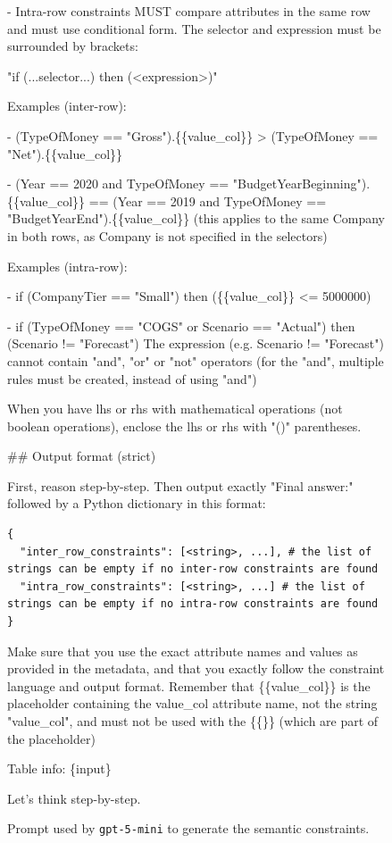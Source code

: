 \begin{figure}[t!]
\begin{tcolorbox}[
  title=Semantic constraint generation prompt,
  fonttitle=\bfseries,
  sharp corners=all,
]
- Intra-row constraints MUST compare attributes in the same row and must use conditional form. The selector and expression must be surrounded by brackets:

  "if (...selector...) then (<expression>)"

Examples (inter-row):

- (TypeOfMoney == "Gross").\{\{value\_col\}\} > (TypeOfMoney == "Net").\{\{value\_col\}\}

- (Year == 2020 and TypeOfMoney == "BudgetYearBeginning").\{\{value\_col\}\} == (Year == 2019 and TypeOfMoney == "BudgetYearEnd").\{\{value\_col\}\}
    (this applies to the same Company in both rows, as Company is not specified in the selectors)

Examples (intra-row):

- if (CompanyTier == "Small") then (\{\{value\_col\}\} <= 5000000)

- if (TypeOfMoney == "COGS" or Scenario == "Actual") then (Scenario != "Forecast")
The expression (e.g. Scenario != "Forecast") cannot contain "and", "or" or "not" operators (for the "and", multiple rules must be created, instead of using "and")

When you have lhs or rhs with mathematical operations (not boolean operations), enclose the lhs or rhs with "()" parentheses.

\#\# Output format (strict)

First, reason step-by-step. Then output exactly "Final answer:" followed by a Python dictionary in this format:
\begin{Verbatim}[fontsize=\small, breaklines=true, breakanywhere=true]
{
  "inter_row_constraints": [<string>, ...], # the list of strings can be empty if no inter-row constraints are found
  "intra_row_constraints": [<string>, ...] # the list of strings can be empty if no intra-row constraints are found
}
\end{Verbatim}
Make sure that you use the exact attribute names and values as provided in the metadata, and that you exactly follow the constraint language and output format.
Remember that \{\{value\_col\}\} is the placeholder containing the value\_col attribute name, not the string "value\_col", and must not be used with the \{\{\}\} (which are part of the placeholder)

Table info: \{input\}

Let's think step-by-step.

\end{tcolorbox}
\caption{Prompt used by \texttt{gpt-5-mini} to generate the semantic constraints.}
\label{fig:sem_prompt}
\end{figure}


